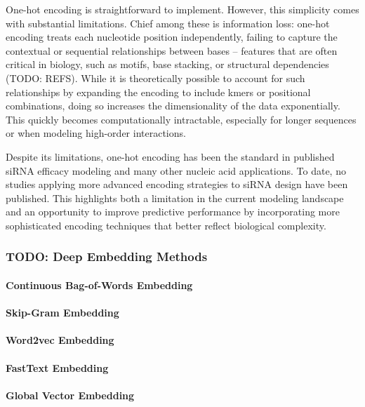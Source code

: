 \documentclass{report}
\begin{document}
One-hot encoding is straightforward to implement. However, this simplicity comes with substantial limitations. Chief among these is information loss: one-hot encoding treats each nucleotide position independently, failing to capture the contextual or sequential relationships between bases – features that are often critical in biology, such as motifs, base stacking, or structural dependencies (TODO: REFS). While it is theoretically possible to account for such relationships by expanding the encoding to include kmers or positional combinations, doing so increases the dimensionality of the data exponentially. This quickly becomes computationally intractable, especially for longer sequences or when modeling high-order interactions.

Despite its limitations, one-hot encoding has been the standard in published siRNA efficacy modeling and many other nucleic acid applications. To date, no studies applying more advanced encoding strategies to siRNA design have been published. This highlights both a limitation in the current modeling landscape and an opportunity to improve predictive performance by incorporating more sophisticated encoding techniques that better reflect biological complexity. 


\subsubsection{TODO: Deep Embedding Methods}\label{sec:deep embedding}
\paragraph{Continuous Bag-of-Words Embedding}\label{sec:cbow}
\paragraph{Skip-Gram Embedding}\label{sec:skip-gram}
\paragraph{Word2vec Embedding}\label{sec:word2vec}
\paragraph{FastText Embedding}\label{sec:fasttext}
\paragraph{Global Vector Embedding}\label{glove}
\end{document}
